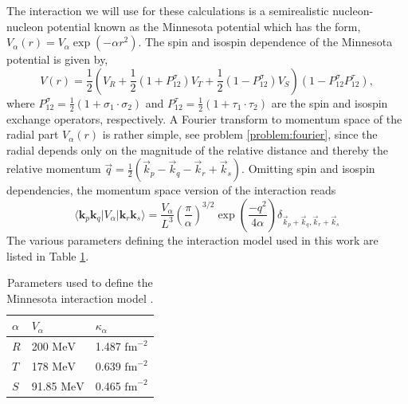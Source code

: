 The interaction we will use for these calculations is a semirealistic
nucleon-nucleon potential known as the Minnesota potential
\cite{minnesota} which has the form, $V_{\alpha}\left(
r\right)=V_{\alpha}\exp{(-\alpha r^{2})}$. The spin and isospin
dependence of the Minnesota potential is given by,
\begin{equation}
V\left( r\right)=\frac{1}{2}\left( V_{R}+\frac{1}{2}\left(
1+P_{12}^{\sigma}\right) V_{T}+\frac{1}{2}\left(
1-P_{12}^{\sigma}\right) V_{S}\right)\left(
1-P_{12}^{\sigma}P_{12}^{\tau}\right),
\end{equation}
where $P_{12}^{\sigma}=\frac{1}{2}\left(
1+\sigma_{1}\cdot\sigma_{2}\right)$ and
$P_{12}^{\tau}=\frac{1}{2}\left( 1+\tau_{1}\cdot\tau_{2}\right)$ are
the spin and isospin exchange operators, respectively. A Fourier
transform to momentum space of the radial part $V_{\alpha}\left(
r\right)$ is rather simple, see problem \ref{problem:fourier}, since
the radial depends only on the magnitude of the relative distance and
thereby the relative momentum
$\vec{q}=\frac{1}{2}\left(\vec{k}_{p}-\vec{k}_{q}-\vec{k}_{r}+\vec{k}_{s}\right)$. Omitting
spin and isospin dependencies, the momentum space version of the
interaction reads
\begin{equation}
\langle \mathbf{k}_p \mathbf{k}_q \vert V_{\alpha}\vert
\mathbf{k}_r\mathbf{k}_s\rangle=\frac{V_{\alpha}}{L^{3}}\left(\frac{\pi}{\alpha}\right)^{3/2}\exp{(\frac{-q^{2}}{4\alpha})}\delta_{\vec{k}_{p}+\vec{k}_{q},\vec{k}_{r}+\vec{k}_{s}}
\end{equation}
The various parameters defining the interaction model used in this
work are listed in Table \ref{tab:minnesotatab}.
\begin{table}
\caption{Parameters used to define the Minnesota interaction model
  \cite{minnesota}.}\label{tab:minnesotatab}
\begin{center}
  \begin{tabular}{| l | l | l |}
    \hline $\alpha$ & $V_{\alpha}$ & $\kappa_{\alpha}$ \\ \hline $R$ &
    200 $\mathrm{MeV}$ & 1.487 $\mathrm{fm}^{-2}$ \\ \hline $T$ & 178
    $\mathrm{MeV}$ & 0.639 $\mathrm{fm}^{-2}$ \\ \hline $S$ & 91.85
    $\mathrm{MeV}$ & 0.465 $\mathrm{fm}^{-2}$ \\ \hline
  \end{tabular}
\end{center}
\end{table}


